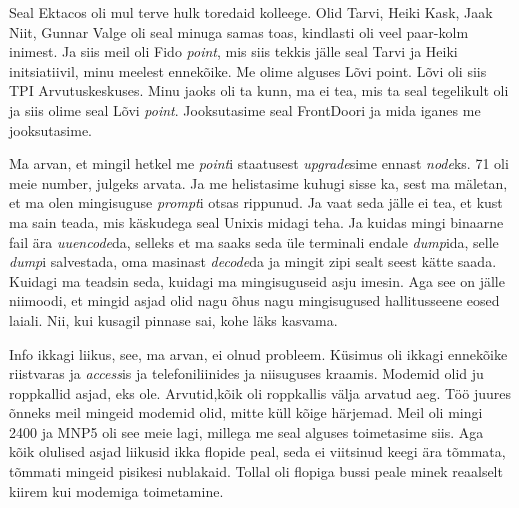 
Seal Ektacos oli mul terve hulk toredaid kolleege. Olid 
Tarvi, Heiki Kask, Jaak 
Niit, Gunnar Valge oli seal 
minuga samas toas, kindlasti oli veel paar-kolm inimest. Ja siis meil oli 
Fido \emph{point}, mis siis tekkis jälle seal Tarvi ja Heiki 
initsiatiivil, minu meelest ennekõike. Me olime alguses Lõvi point. 
Lõvi oli siis TPI 
Arvutuskeskuses. Minu jaoks oli ta 
kunn, ma ei tea, mis ta seal tegelikult oli ja siis olime seal Lõvi 
\emph{point}. Jooksutasime seal FrontDoori ja mida iganes me jooksutasime. 

Ma arvan, et mingil hetkel me \emph{point}i staatusest \emph{upgrade}sime 
ennast \emph{node}ks. 71 oli meie number, julgeks arvata. Ja me helistasime 
kuhugi sisse ka, sest ma mäletan, et ma olen mingisuguse \emph{prompt}i otsas 
rippunud. Ja vaat seda jälle ei tea, et kust ma sain teada, mis käskudega seal 
Unixis midagi teha. Ja kuidas mingi binaarne fail ära 
\emph{uuencode}da, selleks et ma saaks seda üle terminali endale 
\emph{dump}ida, selle \emph{dump}i salvestada, oma masinast \emph{decode}da ja 
mingit zipi sealt seest kätte saada. Kuidagi ma teadsin seda, kuidagi ma 
mingisuguseid asju imesin. Aga see on jälle niimoodi, et mingid asjad olid nagu 
õhus nagu mingisugused hallitusseene eosed laiali. Nii, kui kusagil pinnase 
sai, kohe läks kasvama. 


Info ikkagi liikus, see, ma arvan, ei olnud probleem. Küsimus oli ikkagi 
ennekõike riistvaras ja \emph{access}is ja  telefoniliinides ja niisuguses 
kraamis. Modemid olid ju roppkallid asjad, eks ole. Arvutid,kõik oli roppkallis 
välja arvatud aeg. Töö juures õnneks meil mingeid modemid olid, mitte küll 
kõige härjemad. Meil oli mingi 2400 ja MNP5 oli see meie lagi, millega me seal alguses toimetasime siis. 
Aga kõik olulised asjad liikusid ikka flopide peal, seda ei viitsinud keegi 
ära tõmmata, tõmmati mingeid pisikesi nublakaid. Tollal oli flopiga bussi peale 
minek reaalselt kiirem kui modemiga toimetamine.


